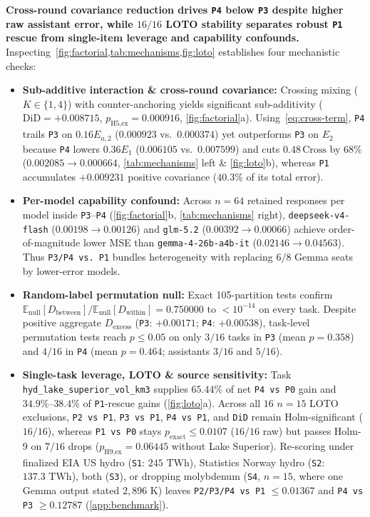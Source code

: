 \documentclass[11pt,letterpaper]{article}
\theoremstyle{plain}
\newcommand{\taskid}[1]{\texttt{\small\hyphenpenalty=50 #1}}
\begin{document}
\noindent\textbf{Cross-round covariance reduction drives \texttt{P4} below \texttt{P3} despite higher raw assistant error, while $16/16$ LOTO stability separates robust \texttt{P1} rescue from single-item leverage and capability confounds.}
Inspecting~\cref{fig:factorial,tab:mechanisms,fig:loto} establishes four mechanistic checks:
\begin{itemize}
  \item \textbf{Sub-additive interaction \& cross-round covariance:} Crossing mixing ($K \in \{1,4\}$) with counter-anchoring yields significant sub-additivity ($\text{DiD}=+0.008715$, $p_{\text{H5,ex}}=0.000916$, \cref{fig:factorial}a). Using~\eqref{eq:cross-term}, \texttt{P4} trails \texttt{P3} on $0.16 E_{a,2}$ ($0.000923$ vs.\ $0.000374$) yet outperforms \texttt{P3} on $E_2$ because \texttt{P4} lowers $0.36 E_1$ ($0.006105$ vs.\ $0.007599$) and cuts $0.48\,\text{Cross}$ by $68\%$ ($0.002085 \to 0.000664$, \cref{tab:mechanisms} left \& \cref{fig:loto}b), whereas \texttt{P1} accumulates $+0.009231$ positive covariance ($40.3\%$ of its total error).
  \item \textbf{Per-model capability confound:} Across $n=64$ retained responses per model inside \texttt{P3}--\texttt{P4} (\cref{fig:factorial}b, \cref{tab:mechanisms} right), \texttt{deepseek-v4-flash} ($0.00198 \to 0.00126$) and \texttt{glm-5.2} ($0.00392 \to 0.00066$) achieve order-of-magnitude lower MSE than \texttt{gemma-4-26b-a4b-it} ($0.02146 \to 0.04563$). Thus \texttt{P3/P4 vs.\ P1} bundles heterogeneity with replacing $6/8$ Gemma seats by lower-error models.
  \item \textbf{Random-label permutation null:} Exact 105-partition tests confirm $\mathbb{E}_{\text{null}}[D_{\text{between}}]/\mathbb{E}_{\text{null}}[D_{\text{within}}]=0.750000$ to $<10^{-14}$ on every task. Despite positive aggregate $D_{\text{excess}}$ (\texttt{P3}: $+0.00171$; \texttt{P4}: $+0.00538$), task-level permutation tests reach $p\le 0.05$ on only $3/16$ tasks in \texttt{P3} (mean $p=0.358$) and $4/16$ in \texttt{P4} (mean $p=0.464$; assistants $3/16$ and $5/16$).
  \item \textbf{Single-task leverage, LOTO \& source sensitivity:} Task \taskid{hyd\_lake\_superior\_vol\_km3} supplies $65.44\%$ of net \texttt{P4 vs P0} gain and $34.9\%$--$38.4\%$ of \texttt{P1}-rescue gains (\cref{fig:loto}a). Across all $16$ $n=15$ LOTO exclusions, \texttt{P2 vs P1}, \texttt{P3 vs P1}, \texttt{P4 vs P1}, and \texttt{DiD} remain Holm-significant ($16/16$), whereas \texttt{P1 vs P0} stays $p_{\text{exact}} \le 0.0107$ ($16/16$ raw) but passes Holm-9 on $7/16$ drops ($p_{\text{H9,ex}}=0.06445$ without Lake Superior). Re-scoring under finalized EIA US hydro (\texttt{S1}: $245\text{ TWh}$), Statistics Norway hydro (\texttt{S2}: $137.3\text{ TWh}$), both (\texttt{S3}), or dropping molybdenum (\texttt{S4}, $n=15$, where one Gemma output stated $2{,}896\text{ K}$) leaves \texttt{P2/P3/P4 vs P1} $\le 0.01367$ and \texttt{P4 vs P3} $\ge 0.12787$ (\cref{app:benchmark}).
\end{itemize}
\end{document}

